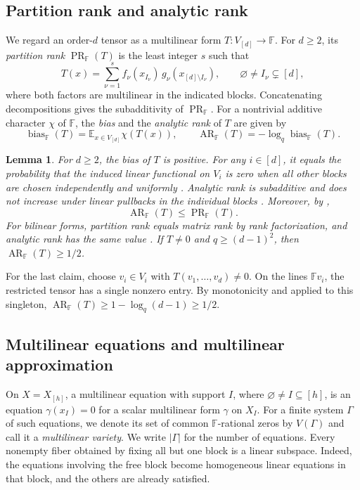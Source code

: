 \documentclass[11pt,reqno]{amsart}
\theoremstyle{plain}
\newtheorem{lemma}[theorem]{Lemma}
\theoremstyle{definition}
\newcommand{\F}{\mathbb F}
\newcommand{\E}{\mathbb E}
\DeclareMathOperator{\bias}{bias}
\DeclareMathOperator{\arank}{AR}
\DeclareMathOperator{\prank}{PR}
\begin{document}
\subsection{Partition rank and analytic rank}
We regard an order-$d$ tensor as a multilinear form $T\colon V_{[d]}\to\F$. For $d\geq 2$, its \emph{partition rank} $\prank_{\F}(T)$ is the least integer $s$ such that
\[
 T(x)=\sum_{\nu=1}^s f_\nu(x_{I_\nu})\,g_\nu(x_{[d]\setminus I_\nu}),
 \qquad \varnothing\ne I_\nu\subsetneq[d],
\]
where both factors are multilinear in the indicated blocks. Concatenating decompositions gives the subadditivity of $\prank_{\F}$. For a nontrivial additive character $\chi$ of $\F$, the \emph{bias} and the \emph{analytic rank} of $T$ are given by
\[
 \bias_{\F}(T)=\E_{x\in V_{[d]}}\chi(T(x)),\qquad
 \arank_{\F}(T)=-\log_q\bias_{\F}(T).
\]

\begin{lemma}\label{lem:bias}
For $d\geq2$, the bias of $T$ is positive. For any $i\in[d]$, it equals
the probability that the induced linear functional on $V_i$ is zero
when all other blocks are chosen independently and uniformly \cite[(1)]{lovett2018analytic}.
Analytic rank is subadditive \cite[Theorem~1.5]{lovett2018analytic} and does not
increase under linear pullbacks in the individual blocks
\cite[Lemma~1.4.7]{BDR}. Moreover, by \cite[Theorem~1.7(i)]{lovett2018analytic},
\begin{equation}\label{eq:easy}
 \arank_{\F}(T)\leq\prank_{\F}(T).
\end{equation}
For bilinear forms, partition rank equals matrix rank by rank
factorization, and analytic rank has the same value
\cite[Example~1.4]{lovett2018analytic}. If $T\ne0$ and $q\geq(d-1)^2$, then
$\arank_{\F}(T)\geq1/2$.
\end{lemma}

For the last claim, choose $v_i\in V_i$ with $T(v_1,\ldots,v_d)\ne0$.
On the lines $\F v_i$, the restricted tensor has a single nonzero entry.
By monotonicity and \cite[Theorem~1.7(ii)]{lovett2018analytic} applied to this
singleton, $\arank_{\F}(T)\geq1-\log_q(d-1)\geq1/2$.

\subsection{Multilinear equations and multilinear approximation}\label{subsec:mixed}
On $X=X_{[h]}$, a multilinear equation with support $I$, where
$\varnothing\ne I\subseteq[h]$, is an equation $\gamma(x_I)=0$ for
a scalar multilinear form $\gamma$ on $X_I$. For a finite system
$\Gamma$ of such equations, we denote its set of common $\F$-rational
zeros by $V(\Gamma)$ and call it a \emph{multilinear variety}. We write
$|\Gamma|$ for the number of equations. Every nonempty fiber obtained
by fixing all but one block is a linear subspace. Indeed, the equations
involving the free block become homogeneous linear equations in that
block, and the others are already satisfied.
\end{document}
